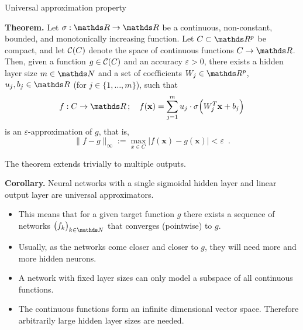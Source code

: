 \documentclass[11pt,compress,t,notes=noshow, xcolor=table]{beamer}
\begin{document}
\begin{vbframe}{Universal approximation property}

  \textbf{Theorem.}
  Let $\sigma : \R \to \R$ be a continuous, non-constant, bounded, and
  monotonically increasing function. Let $C \subset \R^p$ be compact,
  and let $\mathcal{C}(C)$ denote the space of continuous functions $C \to \R$.
  Then, given a function $g \in \mathcal{C}(C)$ and an accuracy $\varepsilon > 0$,
  there exists a hidden layer size $m \in \N$ and a set of coefficients
  $W_j \in \R^p$, $u_j, b_j \in \R$
  (for $j \in \{1, \dots, m\}$), such that
  $$
    f : C \to \R \,;\quad f(\mathbf{x}) = \sum_{j=1}^m u_j \cdot \sigma \Big( W_j^T \mathbf{x} + b_j \Big)
  $$
  is an $\varepsilon$-approximation of $g$, that is,
  $$
    \|f - g\|_{\infty} := \max_{x \in C} |f(\mathbf{x}) - g(\mathbf{x})| < \varepsilon
    \enspace.
  $$

  The theorem extends trivially to multiple outputs.

  \framebreak

  \textbf{Corollary.}
  Neural networks with a single sigmoidal hidden layer and linear
  output layer are universal approximators.

  \begin{itemize}
    \item This means that for a given target function $g$ there exists a
    sequence of networks $\big( f_k \big)_{k \in \N}$ that converges
    (pointwise) to $g$.%
    \vspace{2mm}
    \item Usually, as the networks come closer and closer to $g$, they
    will need more and more hidden neurons.
    \vspace{2mm}
    \item A network with fixed layer sizes can only model a subspace of all
    continuous functions. %
    \vspace{2mm}
    \item The continuous functions form an infinite dimensional vector space.
    Therefore arbitrarily large hidden layer sizes are needed.
  \end{itemize}

  \framebreak


\end{vbframe}
\end{document}
